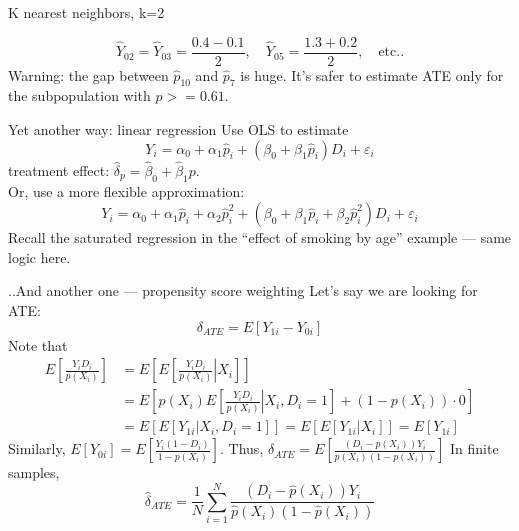 \documentclass[beamer,compress]{beamer}
\begin{document}
\begin{frame}{K nearest neighbors, k=2}

\begin{equation*}
	\widehat{Y}_{02} = \widehat{Y}_{03} = \frac{0.4 - 0.1}{2}, \quad \widehat{Y}_{05} = \frac{1.3 + 0.2}{2}, \quad \text{etc..}
\end{equation*}
Warning: the gap between $\widehat{p}_{10}$ and $\widehat{p}_{7}$ is huge. It's safer to estimate ATE only for the subpopulation with $p>=0.61$.
\end{frame}

\begin{frame}{Yet another way: linear regression}
	Use OLS to estimate
	\begin{equation*}
		Y_i = \alpha_0 + \alpha_1\widehat{p}_i + (\beta_0 + \beta_1\widehat{p}_i)D_i + \varepsilon_i
	\end{equation*}
	treatment effect: $\widehat{\delta}_p = \widehat{\beta}_0 + \widehat{\beta}_1p$.\\
	
	Or, use a more flexible approximation:
	\begin{equation*}
		Y_i = \alpha_0 + \alpha_1\widehat{p}_i + \alpha_2\widehat{p}_i^2 + (\beta_0 + \beta_1\widehat{p}_i + \beta_2\widehat{p}^2_i)D_i + \varepsilon_i
	\end{equation*}
	Recall the saturated regression in the ``effect of smoking by age'' example --- same logic here.
\end{frame}

\begin{frame}{..And another one --- propensity score weighting}
	Let's say we are looking for ATE:
	\begin{equation*}
		\delta_{ATE} = E[Y_{1i} - Y_{0i}]
	\end{equation*}
	Note that
	\begin{align*}
		E\left[\frac{Y_iD_i}{p(X_i)}\right] &=  E\left[E\left[\left.\frac{Y_iD_i}{p(X_i)}\right|X_i\right]\right]\\
		&=E\left[p(X_i)E\left[\left.\frac{Y_iD_i}{p(X_i)}\right|X_i, D_i=1\right] + (1-p(X_i))\cdot{}0\right]\\
		&=E\left[E\left[\left.Y_{1i}\right|X_i, D_i=1\right]\right] = E\left[E\left[\left.Y_{1i}\right|X_i\right]\right] = E\left[Y_{1i}\right]
	\end{align*}
	Similarly, $E[Y_{0i}] = E\left[\frac{Y_i(1-D_i)}{1-p(X_i)}\right]$. Thus, $\delta_{ATE} = E\left[\frac{(D_i-p(X_i))Y_i}{p(X_i)(1-p(X_i))}\right]$
	In finite samples,
	\begin{equation*}
		\widehat{\delta}_{ATE} = \frac{1}{N}\sum\limits_{i=1}^N\frac{(D_i-\widehat{p}(X_i))Y_i}{\widehat{p}(X_i)(1-\widehat{p}(X_i))}
	\end{equation*}
\end{frame}
\end{document}
